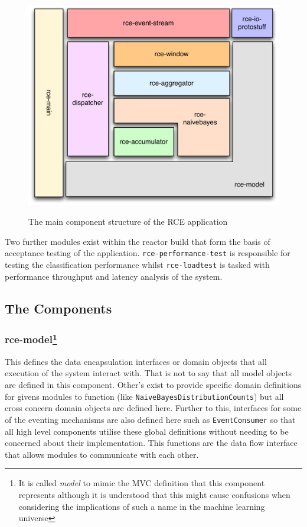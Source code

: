 \documentclass[a4paper,11pt]{scrreprt}
\begin{document}
\begin{figure}[h!]
\centering
\caption{The main component structure of the RCE application}
\includegraphics[scale=0.35, trim=0 0 0 0, clip=true] {reactor-layout.pdf}
\label{fig:indexes}
\end{figure}

Two further modules exist within the reactor build that form the basis of acceptance testing of the application. \verb|rce-performance-test| is responsible for testing the classification performance whilst \verb|rce-loadtest| is tasked with performance throughput and latency analysis of the system.

\subsection{The Components}
\subsubsection[rce-model]{rce-model\protect\footnote{It is called \textit{model} to mimic the MVC definition that this component represents although it is understood that this might cause confusions when considering the implications of such a name in the machine learning universe}}
This defines the data encapsulation interfaces or domain objects that all execution of the system interact with. That is not to say that all model objects are defined in this component. Other's exist to provide specific domain definitions for givens modules to function (like \verb|NaiveBayesDistributionCounts|) but all cross concern domain objects are defined here. Further to this, interfaces for some of the eventing mechanisms are also defined here such as \verb|EventConsumer| so that all high level components utilise these global definitions without needing to be concerned about their implementation. This functions are the data flow interface that allows modules to communicate with each other.
\end{document}
